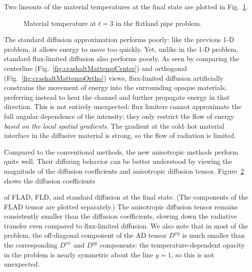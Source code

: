 Two lineouts of the material temperatures at the final state are plotted in
Fig.~\ref{fig:crashaltMattemp}.
%
\begin{figure}[htb]
  \centering\small
  \caption{Material temperature at $t=3$ in the flatland pipe problem.}
  \label{fig:crashaltMattemp}
\end{figure}
%
The standard diffusion approximation performs
poorly: like the previous 1-D problem, it allows energy to move too quickly.
Yet, unlike in the 1-D problem, standard flux-limited diffusion also
performs poorly. As seen by comparing the centerline
(Fig.~\ref{fig:crashaltMattempCenter}) and orthogonal
(Fig.~\ref{fig:crashaltMattempOrtho}) views, flux-limited diffusion artificially
constrains the movement of energy into the surrounding opaque materials,
preferring instead to heat the channel and further propagate energy in that
direction. This is not entirely unexpected: flux limiters cannot approximate the
full angular dependence of the intensity; they only restrict the flow of energy
\emph{based on the local spatial gradients}. The gradient at the cold--hot
material interface in the diffusive material is strong, so the flow of
radiation is limited.

Compared to the conventional methods, the new anisotropic methods perform quite
well.  Their differing behavior can be better understood by viewing the
magnitude of the
diffusion coefficients and anisotropic diffusion tensor.
Figure~\ref{fig:crashaltDcoeff} shows the diffusion coefficients
%
\begin{figure}[htb]
  \centering\small
  \label{fig:crashaltDcoeff}
\end{figure}
%
of FLAD, FLD, and standard diffusion at the final state. (The components of the
FLAD tensor are plotted separately.)
The anisotropic diffusion tensor
remains consistently smaller than the diffusion coefficients, slowing down the
radiative transfer even compared to flux-limited diffusion. We also note that in
most of the problem, the off-diagonal component of the AD tensor $D^{xy}$ is
much smaller than the corresponding $D^{xx}$ and $D^{yy}$ components: the
temperature-dependent opacity in the problem is nearly symmetric about the line
$y=1$, so this is not unexpected.

